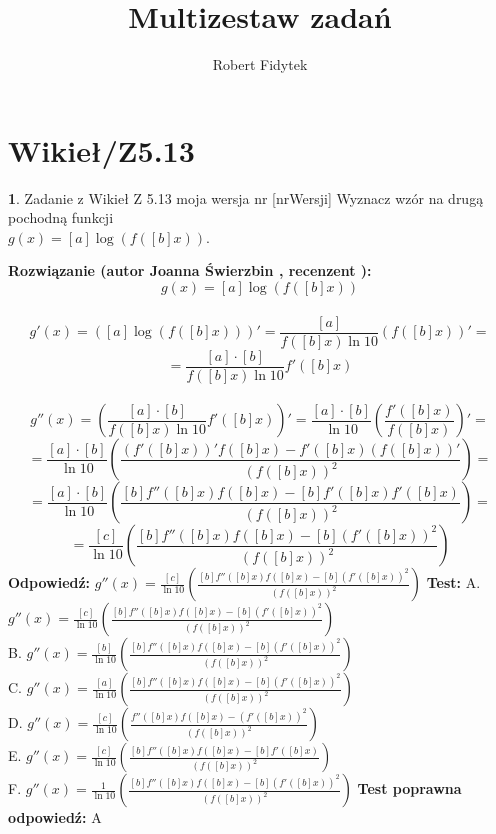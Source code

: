 \documentclass[12pt, a4paper]{article}
\title{Multizestaw zadań}
\author{Robert Fidytek}
\date{}
\theoremstyle{definition} %
\newtheorem{zad}{}
\newcommand{\kategoria}[1]{\section{#1}} %
\newcommand{\zadStart}[1]{\begin{zad}#1\newline} %
\newcommand{\zadStop}{\end{zad}}   %
\newcommand{\rozwStart}[2]{\noindent \textbf{Rozwiązanie (autor #1 , recenzent #2): }\newline} %
\newcommand{\rozwStop}{\newline}                                            %
\newcommand{\odpStart}{\noindent \textbf{Odpowiedź:}\newline}    %
\newcommand{\odpStop}{\newline}                                             %
\newcommand{\testStart}{\noindent \textbf{Test:}\newline} %
\newcommand{\testStop}{\newline} %
\newcommand{\kluczStart}{\noindent \textbf{Test poprawna odpowiedź:}\newline} %
\newcommand{\kluczStop}{\newline} %
\begin{document}
\maketitle


\kategoria{Wikieł/Z5.13}
\zadStart{Zadanie z Wikieł Z 5.13 moja wersja nr [nrWersji]}
Wyznacz wzór na drugą pochodną funkcji \\ $g(x)=[a]\log(f([b]x))$.
\zadStop
\rozwStart{Joanna Świerzbin}{}
$$g(x)=[a]\log(f([b]x))$$\\
$$g'(x)= \left([a]\log(f([b]x)) \right)' = \frac{[a]}{f([b]x)\ln 10} (f([b]x))' =$$
$$= \frac{[a]\cdot[b]}{f([b]x)\ln 10} f'([b]x) $$\\
$$g''(x)= \left( \frac{[a]\cdot[b]}{f([b]x)\ln 10} f'([b]x) \right)'= \frac{[a]\cdot[b]}{\ln 10} \left(\frac{f'([b]x)}{f([b]x)} \right)' =$$
$$= \frac{[a]\cdot[b]}{\ln 10} \left(\frac{(f'([b]x))'f([b]x)-f'([b]x)(f([b]x))'}{(f([b]x))^2} \right) =$$
$$= \frac{[a]\cdot[b]}{\ln 10} \left(\frac{[b] f''([b]x) f([b]x) -[b] f'([b]x)f'([b]x)}{(f([b]x))^2} \right) =$$
$$= \frac{[c]}{\ln 10} \left(\frac{[b] f''([b]x) f([b]x) -[b] (f'([b]x))^2}{(f([b]x))^2} \right) $$
\rozwStop
\odpStart
$g''(x)= \frac{[c]}{\ln 10} \left(\frac{[b] f''([b]x) f([b]x) -[b] (f'([b]x))^2}{(f([b]x))^2} \right) $
\odpStop
\testStart
A. $g''(x)= \frac{[c]}{\ln 10} \left(\frac{[b] f''([b]x) f([b]x) -[b] (f'([b]x))^2}{(f([b]x))^2} \right) $\\
B. $g''(x)= \frac{[b]}{\ln 10} \left(\frac{[b] f''([b]x) f([b]x) -[b] (f'([b]x))^2}{(f([b]x))^2} \right) $ \\
C. $g''(x)= \frac{[a]}{\ln 10} \left(\frac{[b] f''([b]x) f([b]x) -[b] (f'([b]x))^2}{(f([b]x))^2} \right) $ \\
D. $g''(x)= \frac{[c]}{\ln 10} \left(\frac{f''([b]x) f([b]x) -(f'([b]x))^2}{(f([b]x))^2} \right) $\\
E. $g''(x)= \frac{[c]}{\ln 10} \left(\frac{[b] f''([b]x) f([b]x) -[b] f'([b]x)}{(f([b]x))^2} \right) $\\
F. $g''(x)= \frac{1}{\ln 10} \left(\frac{[b] f''([b]x) f([b]x) -[b] (f'([b]x))^2}{(f([b]x))^2} \right) $
\testStop
\kluczStart
A
\kluczStop
\end{document}
